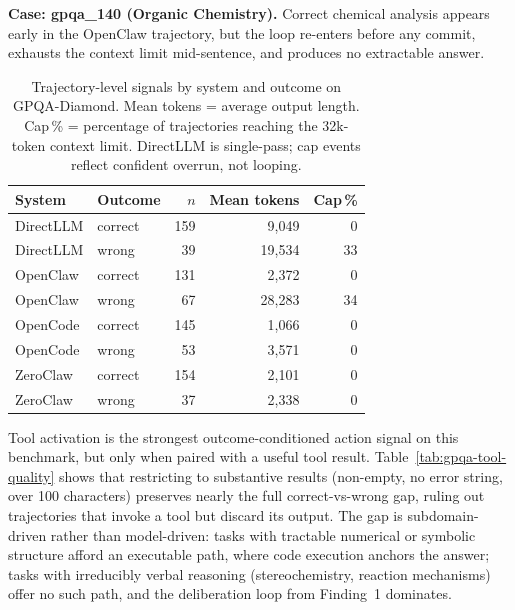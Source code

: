 \textbf{Case: gpqa\_140 (Organic Chemistry).}
Correct chemical analysis appears early in the OpenClaw trajectory, but the
loop re-enters before any commit, exhausts the context limit mid-sentence, and
produces no extractable answer.

\begin{table}[t]
\centering
\small
\caption{%
  Trajectory-level signals by system and outcome on GPQA-Diamond.
  Mean tokens = average output length.
  Cap\,\% = percentage of trajectories reaching the 32k-token context limit.
  DirectLLM is single-pass; cap events reflect confident overrun, not looping.
}
\label{tab:gpqa-goal-loss}
\setlength{\tabcolsep}{4pt}
\begin{tabular}{llrrr}
\toprule
System & Outcome & $n$ & Mean tokens & Cap\,\% \\
\midrule
DirectLLM & correct & 159 &  9{,}049 &  0 \\
DirectLLM & wrong   &  39 & 19{,}534 & 33 \\
\midrule
OpenClaw  & correct & 131 &  2{,}372 &  0 \\
OpenClaw  & wrong   &  67 & 28{,}283 & 34 \\
\midrule
OpenCode  & correct & 145 &  1{,}066 &  0 \\
OpenCode  & wrong   &  53 &  3{,}571 &  0 \\
\midrule
ZeroClaw  & correct & 154 &  2{,}101 &  0 \\
ZeroClaw  & wrong   &  37 &  2{,}338 &  0 \\
\bottomrule
\end{tabular}
\end{table}


Tool activation is the strongest outcome-conditioned action signal on this
benchmark, but only when paired with a useful tool result.
Table~\ref{tab:gpqa-tool-quality} shows that restricting to substantive results
(non-empty, no error string, over 100 characters) preserves nearly the full
correct-vs-wrong gap, ruling out trajectories that invoke a tool but discard its
output.
The gap is subdomain-driven rather than model-driven: tasks with tractable
numerical or symbolic structure afford an executable path, where code execution
anchors the answer; tasks with irreducibly verbal reasoning (stereochemistry,
reaction mechanisms) offer no such path, and the deliberation loop from
Finding~1 dominates.

